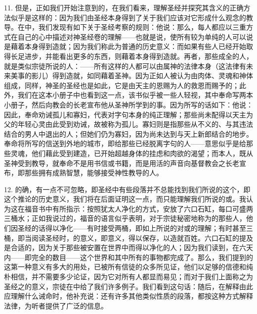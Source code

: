 11. 但是，正如我们开始注意到的，在我们看来，理解圣经并探究其含义的正确方法似乎是这样的：因为我们由圣经本身得到了关于我们应该对它形成什么观念的教导。在中，我们发现有如下关于圣经考察的规则：他说：那么，每人都应以三重方式在自己的心中描述对神圣经卷的理解——也就是说，使所有较为单纯的人可以说是藉着本身得到造就；因为我们称此为普通的历史意义：而如果有些人已经开始取得长足进步，并能看出更多的东西，则藉着本身得到造就。再者，那些成全的人，就是类似宗徒所说的人：——所有这样的人都可以由属神的法律本身（这法律有未来美事的影儿）得到造就，如同藉着圣神。因为正如人被认为由肉体、灵魂和神体组成，同样，神圣的圣经也是如此，它是由天主的恩赐为人的救恩而赐予的；此外，我们在这本小册子中也看到这一点，该书似乎被一些人轻视，其中奉命写两本小册子，然后向教会的长老宣布他从圣神所学到的事。因为所写的话如下：他说：因此，奉命劝诫孤儿和寡妇，代表对字句本身的纯正理解；那些尚未配得以天主为父的年轻心灵由此受到劝诫，故被称为孤儿。寡妇则是指那些从不义的、与其违法结合的男人中退出的人；但她们仍为寡妇，因为尚未达到与天上新郎结合的地步。奉命将所写的信送到外地的城市，即给那些已经脱离字句的人——意思似乎是给那些灵魂，他们藉此受到建造，已开始超越身体的挂虑和肉欲的渴望；而本人，既从圣神受到教导，就奉命不是用书信或书籍，而是用活的声音向基督教会之长老宣布，即那些拥有成熟智慧，能够接受神性教导的人。\par

12. 的确，有一点不可忽略，即圣经中有些段落并不总能找到我们所说的这个，即这个推论的历史意义，我们将在后面证明这一点，而只能理解我们所说的或。我认为这在福音书中有所指示：按照犹太人净化的方式，安放了六口石缸，每口可盛两三桶水；正如我说过的，福音的语言似乎表明，对于宗徒秘密地称为的那些人，他们因圣经的话得以净化——有时接受两桶，即如上所说的对或的理解；有时甚至三桶，即当阅读圣经时，的意义，即意义，得以保存，以造就百姓。六口石缸的提及是合适的，因为关于那些被安置在世界中而得以净化的人；因为我们读到，在六天内——即完全的数目——这个世界和其中所有的事物都完成了。那么，我们提到的这第一种意义有多大的用处，已被所有信徒的众多所见证，他们以足够的信德和纯朴相信，并不需要多少论证，因为它对所有人都显而易见；而对于我们上面称之为圣经之的意义，宗徒在中给了我们许多例子。我们看到这句话：随后，在解释由此应理解什么诫命时，他补充说：还有许多其他类似性质的段落，都按这种方式解释法律，为听者提供了广泛的信息。\par

